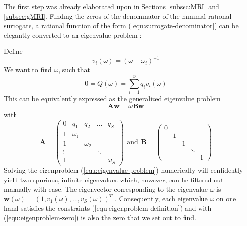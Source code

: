 \documentclass[11pt, a4paper]{article}
\begin{document}
The first step was already elaborated upon in Sections \ref{subsec:MRI} and \ref{subsec:gMRI}.
Finding the zeros of the denominator of the minimal rational surrogate,
a rational function of the form (\ref{equ:surrogate-denominator})
can be elegantly converted to an eigenvalue problem \citep{klein}:

Define
\begin{equation}
    v_i(\omega) = (\omega - \omega_i)^{-1} \label{equ:eigenproblem-definition}
\end{equation}
We want to find $\omega$, such that
\begin{equation}
    0 = Q(\omega) = \sum_{i=1}^S q_i v_i(\omega) \label{equ:eigenproblem-zero}
\end{equation}
This can be equivalently expressed as the generalized eigenvalue problem
\begin{equation}
    \mathbf{\underline{A}} \mathbf{w} = \omega \mathbf{\underline{B}} \mathbf{w} \label{equ:eigenvalue-problem}
\end{equation}
with
\begin{equation}
    \mathbf{\underline{A}} = \begin{pmatrix}
        0 & q_1 & q_2 & \dots & q_S \\
        1 & \omega_1 & & & \\
        1 & & \omega_2 & & \\ 
        \vdots & & & \ddots & \\ 
        1 & & & & \omega_S
    \end{pmatrix} ~~\text{and}~~
    \mathbf{\underline{B}} = \begin{pmatrix}
         0 & & & & \\
         & 1 & & & \\
         & & 1 & & \\ 
         & & & \ddots & \\ 
         & & & & 1
    \end{pmatrix}\label{equ:root-finding}
\end{equation}
Solving the eigenproblem (\ref{equ:eigenvalue-problem}) numerically will confidently
yield two spurious, infinite eigenvalues which, however, can be filtered out
manually with ease. The eigenvector corresponding to the eigenvalue $\omega$ is
$\mathbf{w}(\omega) = (1, v_1(\omega), \dots, v_S(\omega))^T$ \cite{klein}.
Consequently, each eigenvalue $\omega$ on one hand satisfies the constraints
(\ref{equ:eigenproblem-definition}) and with (\ref{equ:eigenproblem-zero})
is also the zero that we set out to find.
\end{document}
